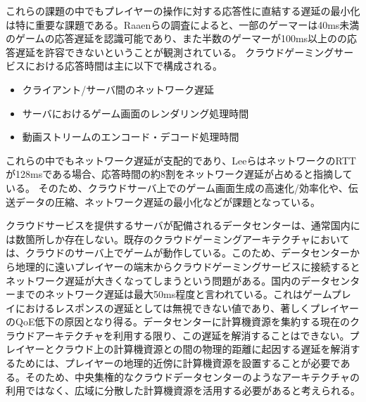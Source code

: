 これらの課題の中でもプレイヤーの操作に対する応答性に直結する遅延の最小化は特に重要な課題である。Raaen\cite{delay}らの調査によると、一部のゲーマーは40ms未満のゲームの応答遅延を認識可能であり、また半数のゲーマーが100ms以上のの応答遅延を許容できないということが観測されている。
クラウドゲーミングサービスにおける応答時間は主に以下で構成される。
\begin{itemize}
    \item クライアント/サーバ間のネットワーク遅延
    \item サーバにおけるゲーム画面のレンダリング処理時間
    \item 動画ストリームのエンコード・デコード処理時間
\end{itemize}
これらの中でもネットワーク遅延が支配的であり、Lee\cite{outatime}らはネットワークのRTTが128msである場合、応答時間の約8割をネットワーク遅延が占めると指摘している。
そのため、クラウドサーバ上でのゲーム画面生成の高速化/効率化や、伝送データの圧縮、ネットワーク遅延の最小化などが課題となっている。

クラウドサービスを提供するサーバが配備されるデータセンターは、通常国内には数箇所しか存在しない。既存のクラウドゲーミングアーキテクチャにおいては、クラウドのサーバ上でゲームが動作している。このため、データセンターから地理的に遠いプレイヤーの端末からクラウドゲーミングサービスに接続するとネットワーク遅延が大きくなってしまうという問題がある。国内のデータセンターまでのネットワーク遅延は最大50ms程度と言われている。これはゲームプレイにおけるレスポンスの遅延としては無視できない値であり、著しくプレイヤーのQoE低下の原因となり得る。データセンターに計算機資源を集約する現在のクラウドアーキテクチャを利用する限り、この遅延を解消することはできない。プレイヤーとクラウド上の計算機資源との間の物理的距離に起因する遅延を解消するためには、プレイヤーの地理的近傍に計算機資源を設置することが必要である。そのため、中央集権的なクラウドデータセンターのようなアーキテクチャの利用ではなく、広域に分散した計算機資源を活用する必要があると考えられる。

